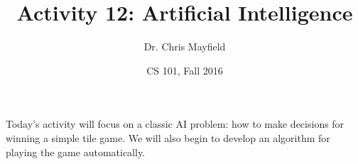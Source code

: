 \documentclass[12pt]{article}
\title{Activity 12: Artificial Intelligence}
\author{Dr. Chris Mayfield}
\date{CS 101, Fall 2016}
\begin{document}
\maketitle

Today's activity will focus on a classic AI problem: how to make decisions for winning a simple tile game.
We will also begin to develop an algorithm for playing the game automatically.



\end{document}
